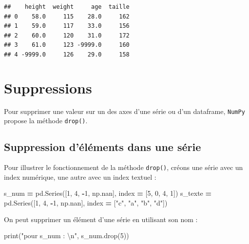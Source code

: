 \documentclass[12pt,]{book}
\newenvironment{Shaded}{\begin{snugshade}}{\end{snugshade}}
\newcommand{\DecValTok}[1]{\textcolor[rgb]{0.00,0.00,0.81}{#1}}
\newcommand{\CharTok}[1]{\textcolor[rgb]{0.31,0.60,0.02}{#1}}
\newcommand{\StringTok}[1]{\textcolor[rgb]{0.31,0.60,0.02}{#1}}
\newcommand{\OperatorTok}[1]{\textcolor[rgb]{0.81,0.36,0.00}{\textbf{#1}}}
\newcommand{\BuiltInTok}[1]{#1}
\newcommand{\NormalTok}[1]{#1}
\numberwithin{equation}{section}
\numberwithin{countremarque}{section}
\begin{document}
\begin{lstlisting}
##    height  weight     age  taille
## 0    58.0     115    28.0     162
## 1    59.0     117    33.0     156
## 2    60.0     120    31.0     172
## 3    61.0     123 -9999.0     160
## 4 -9999.0     126    29.0     158
\end{lstlisting}

\section{Suppressions}\label{suppressions}

Pour supprimer une valeur sur un des axes d'une série ou d'un dataframe,
\texttt{NumPy} propose la méthode \texttt{drop()}.

\subsection{Suppression d'éléments dans une
série}\label{suppression-delements-dans-une-serie}

Pour illustrer le fonctionnement de la méthode \texttt{drop()}, créons
une série avec un index numérique, une autre avec un index textuel :

\begin{Shaded}
\begin{Highlighting}[]
\NormalTok{s_num }\OperatorTok{=}\NormalTok{ pd.Series([}\DecValTok{1}\NormalTok{, }\DecValTok{4}\NormalTok{, }\OperatorTok{-}\DecValTok{1}\NormalTok{, np.nan],}
\NormalTok{             index }\OperatorTok{=}\NormalTok{ [}\DecValTok{5}\NormalTok{, }\DecValTok{0}\NormalTok{, }\DecValTok{4}\NormalTok{, }\DecValTok{1}\NormalTok{])}
\NormalTok{s_texte }\OperatorTok{=}\NormalTok{ pd.Series([}\DecValTok{1}\NormalTok{, }\DecValTok{4}\NormalTok{, }\OperatorTok{-}\DecValTok{1}\NormalTok{, np.nan],}
\NormalTok{             index }\OperatorTok{=}\NormalTok{ [}\StringTok{"c"}\NormalTok{, }\StringTok{"a"}\NormalTok{, }\StringTok{"b"}\NormalTok{, }\StringTok{"d"}\NormalTok{])}
\end{Highlighting}
\end{Shaded}

On peut supprimer un élément d'une série en utilisant son nom :

\begin{Shaded}
\begin{Highlighting}[]
\BuiltInTok{print}\NormalTok{(}\StringTok{"pour s_num : }\CharTok{\textbackslash{}n}\StringTok{"}\NormalTok{, s_num.drop(}\DecValTok{5}\NormalTok{))}
\end{Highlighting}
\end{Shaded}
\end{document}
